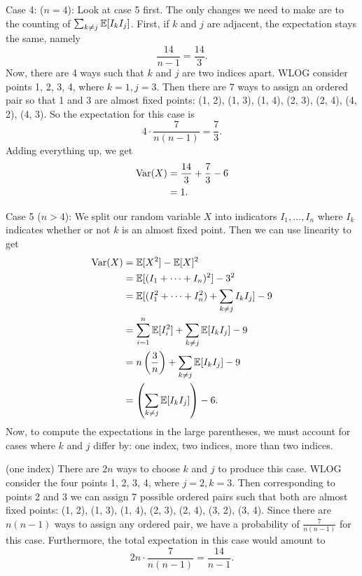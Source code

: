 \begin{enumerate}
    Case 4: ($n = 4$):
    Look at case 5 first. The only changes we need to make are to the counting of $\sum_{k \neq j}\mathbb{E}[I_kI_j]$. First, if $k$ and $j$ are adjacent, the expectation stays the same, namely
    \[
        \frac{14}{n - 1} = \frac{14}{3}.
    \]
    Now, there are 4 ways such that $k$ and $j$ are two indices apart. WLOG consider points 1, 2, 3, 4, where $k = 1, j = 3$. Then there are 7 ways to assign an ordered pair so that 1 and 3 are almost fixed points: (1, 2), (1, 3), (1, 4), (2, 3), (2, 4), (4, 2), (4, 3). So the expectation for this case is 
    \[
        4 \cdot \frac{7}{n(n - 1)} = \frac{7}{3}.
    \]
    Adding everything up, we get
    \begin{align*}
        \text{Var}(X) &= \frac{14}{3} + \frac{7}{3} - 6 \\
            &= 1.
    \end{align*}
    
    
    Case 5 ($n > 4$): 
    We split our random variable $X$ into indicators $I_1, \dots, I_n$ where $I_k$ indicates whether or not $k$ is an almost fixed point. Then we can use linearity to get
    \begin{align*}
        \text{Var}(X) &= \mathbb{E}[X^2] - \mathbb{E}[X]^2 \\
            &= \mathbb{E}[(I_1 + \dots + I_n)^2] - 3^2 \\
            &= \mathbb{E}[(I_1^2 + \dots + I_n^2) + \sum_{k \neq j}I_kI_j] - 9 \\
            &= \sum_{i = 1}^n\mathbb{E}[I_i^2] + \sum_{k \neq j}\mathbb{E}[I_kI_j] - 9 \\
            &= n\left(\frac{3}{n}\right) + \sum_{k \neq j}\mathbb{E}[I_kI_j] - 9 \\
            &= \left(\sum_{k \neq j}\mathbb{E}[I_kI_j]\right) - 6.
    \end{align*}
    Now, to compute the expectations in the large parentheses, we must account for cases where $k$ and $j$ differ by: one index, two indices, more than two indices.
    
    (one index) There are $2n$ ways to choose $k$ and $j$ to produce this case. WLOG consider the four points 1, 2, 3, 4, where $j = 2, k = 3$. Then corresponding to points 2 and 3 we can assign 7 possible ordered pairs such that both are almost fixed points: (1, 2), (1, 3), (1, 4), (2, 3), (2, 4), (3, 2), (3, 4). Since there are $n(n-1)$ ways to assign any ordered pair, we have a probability of $\frac{7}{n(n-1)}$ for this case. Furthermore, the total expectation in this case would amount to
    \[
        2n \cdot \frac{7}{n(n-1)} = \frac{14}{n-1}.
    \]
    

\end{enumerate}
